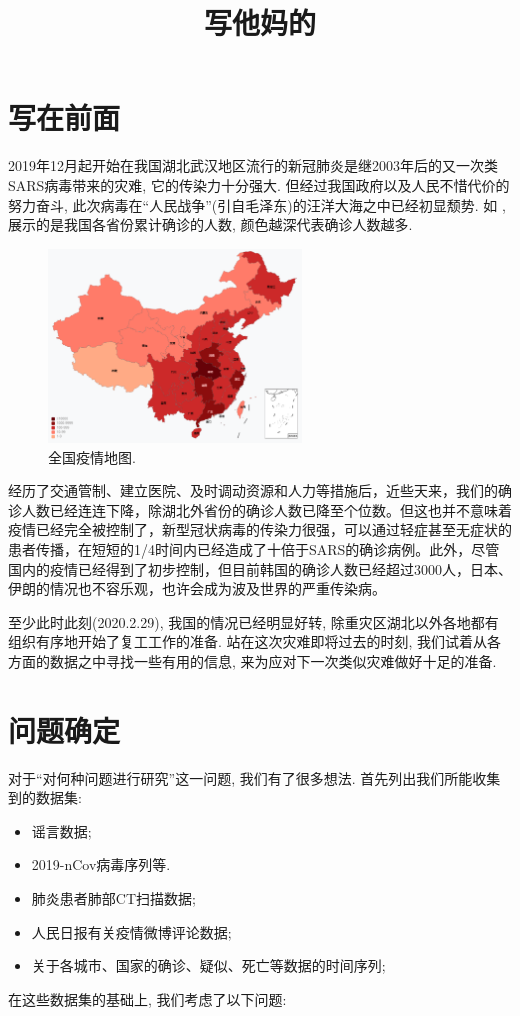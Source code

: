 \documentclass[lang=cn,11pt]{elegantpaper}
\title{写他妈的}
\date{}
\begin{document}
\section{写在前面}
2019年12月起开始在我国湖北武汉地区流行的新冠肺炎是继2003年后的又一次类SARS病毒带来的灾难, 它的传染力十分强大. 但经过我国政府以及人民不惜代价的努力奋斗, 此次病毒在“人民战争”(引自毛泽东)的汪洋大海之中已经初显颓势. 如 , 展示的是我国各省份累计确诊的人数, 颜色越深代表确诊人数越多.
\begin{figure}[htbp]
  \centering
  \includegraphics[width=0.6\textwidth]{map}
  \caption{全国疫情地图. \label{fig:map}}
\end{figure}
经历了交通管制、建立医院、及时调动资源和人力等措施后，近些天来，我们的确诊人数已经连连下降，除湖北外省份的确诊人数已降至个位数。但这也并不意味着疫情已经完全被控制了，新型冠状病毒的传染力很强，可以通过轻症甚至无症状的患者传播，在短短的1/4时间内已经造成了十倍于SARS的确诊病例。此外，尽管国内的疫情已经得到了初步控制，但目前韩国的确诊人数已经超过3000人，日本、伊朗的情况也不容乐观，也许会成为波及世界的严重传染病。

至少此时此刻(2020.2.29), 我国的情况已经明显好转, 除重灾区湖北以外各地都有组织有序地开始了复工工作的准备. 站在这次灾难即将过去的时刻, 我们试着从各方面的数据之中寻找一些有用的信息, 来为应对下一次类似灾难做好十足的准备. 

\section{问题确定}
对于“对何种问题进行研究”这一问题, 我们有了很多想法. 首先列出我们所能收集到的数据集: 
\begin{center}
  \begin{itemize}
    \item 谣言数据;
    \item 2019-nCov病毒序列等.
    \item 肺炎患者肺部CT扫描数据;
    \item 人民日报有关疫情微博评论数据;
    \item 关于各城市、国家的确诊、疑似、死亡等数据的时间序列; 
  \end{itemize}
\end{center}
在这些数据集的基础上, 我们考虑了以下问题:
\end{document}
